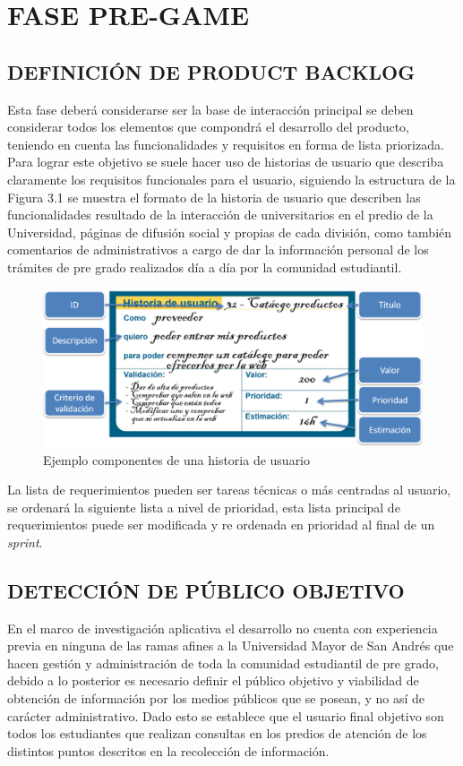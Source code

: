 \documentclass[letter, openright, 12pt]{book}
\newcommand*\setcaptioncitation[1]{\def\captioncitation{\textit{Fuente:}~#1}}
\let\captioncitation\relax
\begin{document}
\section{FASE PRE-GAME}
\subsection{DEFINICIÓN DE { \bf  PRODUCT BACKLOG}}

Esta fase deberá considerarse ser la base de interacción principal se deben considerar todos los elementos que compondrá el desarrollo del producto, teniendo en cuenta las funcionalidades y requisitos en forma de lista priorizada. Para lograr este objetivo se suele hacer uso de historias de usuario que describa claramente los requisitos funcionales para el usuario, siguiendo la estructura de la Figura 3.1 se muestra el formato de la historia de usuario que describen las funcionalidades resultado de la interacción de universitarios en el predio de la Universidad, páginas de difusión social y propias de cada división, como también comentarios de administrativos a cargo de dar la información personal de los trámites de pre grado realizados día a día por la comunidad estudiantil. 
\begin{figure}[htb]
\centering
\includegraphics[width=1\textwidth]{figura3_1}
 \setcaptioncitation{(Menzinsky, 2016)}
 \caption{Ejemplo componentes de una historia de usuario}
\label{fig:figura3_1}
\end{figure}
\par
La lista de requerimientos pueden ser tareas técnicas o más centradas al usuario, se ordenará la siguiente lista a nivel de prioridad, esta lista principal de requerimientos puede ser modificada y re ordenada en prioridad al final de un {\it sprint}. 
\subsection{DETECCIÓN DE PÚBLICO OBJETIVO}
\par
En el marco de investigación aplicativa el desarrollo no cuenta con experiencia previa en ninguna de las ramas afines a la Universidad Mayor de San Andrés que hacen gestión y administración de toda la comunidad estudiantil de pre grado, debido a lo posterior es necesario definir el público objetivo y viabilidad de obtención de información por los medios públicos que se posean, y no así de carácter administrativo. Dado esto se establece que el usuario final objetivo son todos los estudiantes que realizan consultas en los predios de atención de los distintos puntos descritos en la recolección de información. 
\end{document}
